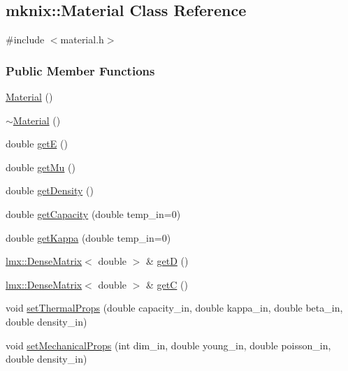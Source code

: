 \hypertarget{classmknix_1_1_material}{}\subsection{mknix\+:\+:Material Class Reference}
\label{classmknix_1_1_material}


{\ttfamily \#include $<$material.\+h$>$}

\subsubsection*{Public Member Functions}
\begin{DoxyCompactItemize}
\item 
\hyperlink{classmknix_1_1_material_a6bfec89c033e42c81479ffeb2cfca33b}{Material} ()
\item 
\hyperlink{classmknix_1_1_material_ab0c23c9dfb7119afa0f20e912d4af6e6}{$\sim$\+Material} ()
\item 
double \hyperlink{classmknix_1_1_material_a5e0f78fc32bea9435b20f6583de1c1e6}{get\+E} ()
\item 
double \hyperlink{classmknix_1_1_material_ae9162080889d12bd5f8759b4efce2e1e}{get\+Mu} ()
\item 
double \hyperlink{classmknix_1_1_material_a65d3c9fb96d96ba179c9e4c3c68b814b}{get\+Density} ()
\item 
double \hyperlink{classmknix_1_1_material_aacb94c35534ffe8a2d15d977ce630b44}{get\+Capacity} (double temp\+\_\+in=0)
\item 
double \hyperlink{classmknix_1_1_material_a93b8de406b8356e577803cc26179b051}{get\+Kappa} (double temp\+\_\+in=0)
\item 
\hyperlink{classlmx_1_1_dense_matrix}{lmx\+::\+Dense\+Matrix}$<$ double $>$ \& \hyperlink{classmknix_1_1_material_a043208ee829f606a01ca631ed14afaf3}{get\+D} ()
\item 
\hyperlink{classlmx_1_1_dense_matrix}{lmx\+::\+Dense\+Matrix}$<$ double $>$ \& \hyperlink{classmknix_1_1_material_a7005a08df113237a9cb6d36959bb9d25}{get\+C} ()
\item 
void \hyperlink{classmknix_1_1_material_a22038cbf9d81b5931294086a409a91cd}{set\+Thermal\+Props} (double capacity\+\_\+in, double kappa\+\_\+in, double beta\+\_\+in, double density\+\_\+in)
\item 
void \hyperlink{classmknix_1_1_material_ac024923b9ec732c56303ead69bb2c130}{set\+Mechanical\+Props} (int dim\+\_\+in, double young\+\_\+in, double poisson\+\_\+in, double density\+\_\+in)

\end{DoxyCompactItemize}
